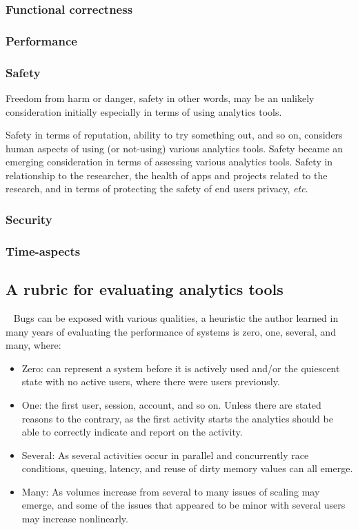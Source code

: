 \subsubsection{Functional correctness}

\subsubsection{Performance}

\subsubsection{Safety}
Freedom from harm or danger, safety in other words, may be an unlikely consideration initially especially in terms of using analytics tools. 

Safety in terms of reputation, ability to try something out, and so on, considers human aspects of using (or not-using) various analytics tools. Safety became an emerging consideration in terms of assessing various analytics tools. Safety in relationship to the researcher, the health of apps and projects related to the research, and in terms of protecting the safety of end users privacy, \emph{etc}.

\subsubsection{Security}

\subsubsection{Time-aspects}

\subsection{A rubric for evaluating analytics tools}~\label{rubric-for-evaluating-analytics-tools}
Bugs can be exposed with various qualities, a heuristic the author learned in many years of evaluating the performance of systems is zero, one, several, and many, where:
\begin{itemize}
    \item Zero: can represent a system before it is actively used and/or the quiescent state with no active users, where there were users previously.
    \item One: the first user, session, account, and so on. Unless there are stated reasons to the contrary, as the first activity starts the analytics should be able to correctly indicate and report on the activity.
    \item Several: As several activities occur in parallel and concurrently race conditions, queuing, latency, and reuse of dirty memory values can all emerge.
    \item Many: As volumes increase from several to many issues of scaling may emerge, and some of the issues that appeared to be minor with several users may increase nonlinearly. 
\end{itemize}

